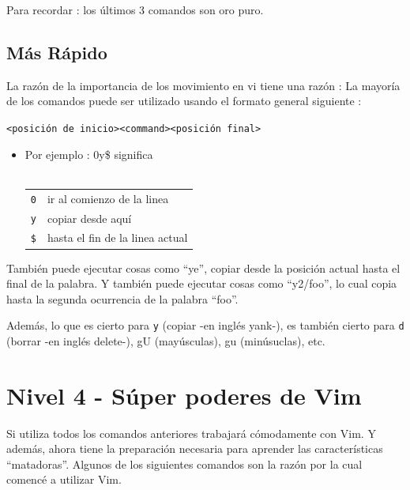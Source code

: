 \documentclass[12pt]{article}
\begin{document}
Para recordar : los últimos 3 comandos son oro puro.

\subsection{Más Rápido}

La razón de la importancia de los movimiento en vi tiene una razón :
La mayoría de los comandos puede ser utilizado usando el formato general siguiente :

\texttt{<posición de inicio><command><posición final>}


\begin{itemize}
	\item Por ejemplo : 0y\$ significa \\ \\
\begin{tabular}{ l l }
	\texttt{0} & ir al comienzo de la linea \\
	\texttt{y} & copiar desde aquí \\
	\texttt{\$} & hasta el fin de la linea actual \\
\end{tabular}
\end{itemize}

También puede ejecutar cosas como ``ye'', copiar desde la posición actual hasta el final de la palabra.
Y también puede ejecutar cosas como ``y2/foo'', lo cual copia hasta la segunda ocurrencia de la palabra ``foo''.

Además, lo que es cierto para \texttt{y} (copiar -en inglés yank-), es también cierto para \texttt{d} (borrar -en inglés delete-), gU (mayúsculas), gu (minúsuclas), etc.

\section{Nivel 4 - Súper poderes de Vim}

Si utiliza todos los comandos anteriores trabajará cómodamente con Vim.
Y además, ahora tiene la preparación necesaria para aprender las características ``matadoras''.  Algunos de los siguientes comandos son la razón por la cual comencé a utilizar Vim.
\end{document}
